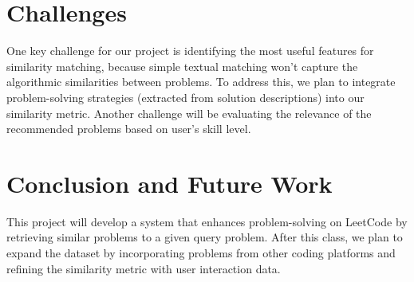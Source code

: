 \documentclass[sigconf]{acmart}
\begin{document}
\section{Challenges}
One key challenge for our project is identifying the most useful features for similarity matching, because simple textual matching won't capture the algorithmic similarities between problems. To address this, we plan to integrate problem-solving strategies (extracted from solution descriptions) into our similarity metric. Another challenge will be evaluating the relevance of the recommended problems based on user's skill level.


\section{Conclusion and Future Work}
This project will develop a system that enhances problem-solving on LeetCode by retrieving similar problems to a given query problem. After this class, we plan to expand the dataset by incorporating problems from other coding platforms and refining the similarity metric with user interaction data.
\end{document}
